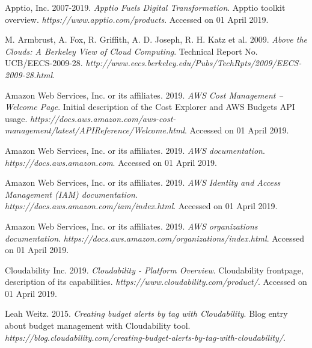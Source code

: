 \documentclass[licencjacka,en]{thesisclass}
\begin{document}
    \begin{thebibliography}{99}

        Apptio, Inc. 2007-2019.
        \textit{Apptio Fuels Digital Transformation}.
        Apptio toolkit overview.
        \textit{https://www.apptio.com/products}.
        Accessed on 01 April 2019.

        M. Armbrust, A. Fox, R. Griffith, A. D. Joseph, R. H. Katz et al. 2009.
        \textit{Above the Clouds: A Berkeley View of Cloud Computing}.
        Technical Report No. UCB/EECS-2009-28.
        \textit{http://www.eecs.berkeley.edu/Pubs/TechRpts/2009/EECS-2009-28.html}.

        Amazon Web Services, Inc. or its affiliates. 2019.
        \textit{AWS Cost Management -- Welcome Page}.
        Initial description of the Cost Explorer and AWS Budgets API usage.
        \textit{https://docs.aws.amazon.com/aws-cost-management/latest/APIReference/Welcome.html}.
        Accessed on 01 April 2019.

        Amazon Web Services, Inc. or its affiliates. 2019.
        \textit{AWS documentation}.
        \textit{https://docs.aws.amazon.com}.
        Accessed on 01 April 2019.

        Amazon Web Services, Inc. or its affiliates. 2019.
        \textit{AWS Identity and Access Management (IAM) documentation}.
        \textit{https://docs.aws.amazon.com/iam/index.html}.
        Accessed on 01 April 2019.

        Amazon Web Services, Inc. or its affiliates. 2019.
        \textit{AWS organizations documentation}.
        \textit{https://docs.aws.amazon.com/organizations/index.html}.
        Accessed on 01 April 2019.

        Cloudability Inc. 2019.
        \textit{Cloudability - Platform Overview}.
        Cloudability frontpage, description of its capabilities.
        \textit{https://www.cloudability.com/product/}.
        Accessed on 01 April 2019.

        Leah Weitz. 2015.
        \textit{Creating budget alerts by tag with Cloudability}.
        Blog entry about budget management with Cloudability tool.
        \textit{https://blog.cloudability.com/creating-budget-alerts-by-tag-with-cloudability/}.


\end{thebibliography}
\end{document}
